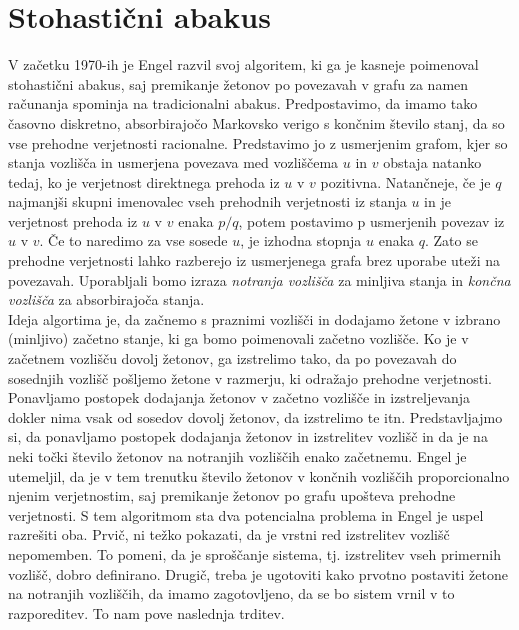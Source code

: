 \documentclass[twoside,11pt]{article}
\begin{document}
\section{Stohastični abakus}
V začetku 1970-ih je Engel razvil svoj algoritem, ki ga je kasneje poimenoval stohastični abakus, saj premikanje žetonov po povezavah v grafu za namen računanja spominja na tradicionalni abakus.
\indent Predpostavimo, da imamo tako časovno diskretno, absorbirajočo Markovsko verigo s končnim število stanj, da so vse prehodne verjetnosti racionalne. Predstavimo jo z usmerjenim grafom, kjer so stanja vozlišča in usmerjena povezava med vozliščema $u$ in $v$ obstaja natanko tedaj, ko je verjetnost direktnega prehoda iz $u$ v $v$ pozitivna. 
Natančneje, če je $q$ najmanjši skupni imenovalec vseh prehodnih verjetnosti iz stanja $u$ in je verjetnost prehoda iz $u$ v $v$ enaka $p/q$, potem postavimo p usmerjenih povezav iz $u$ v $v$. Če to naredimo za vse sosede $u$, je izhodna stopnja $u$ enaka $q$. Zato se prehodne verjetnosti lahko razberejo iz usmerjenega grafa brez uporabe uteži na povezavah. 
Uporabljali bomo izraza \emph{notranja vozlišča} za minljiva stanja in \emph{končna vozlišča} za absorbirajoča stanja. \\
\indent Ideja algortima je, da začnemo s praznimi vozlišči in dodajamo žetone v izbrano (minljivo) začetno stanje, ki ga bomo poimenovali začetno vozlišče. Ko je v začetnem vozlišču dovolj žetonov, ga izstrelimo tako, da po povezavah do sosednjih vozlišč pošljemo žetone v razmerju, ki odražajo prehodne verjetnosti. Ponavljamo postopek dodajanja žetonov v začetno vozlišče in izstreljevanja dokler nima vsak od sosedov dovolj žetonov, da izstrelimo te itn. Predstavljajmo si, da ponavljamo postopek dodajanja žetonov in izstrelitev vozlišč in
da je na neki točki število žetonov na notranjih vozliščih enako začetnemu. Engel je utemeljil, da je v tem trenutku število žetonov v končnih vozliščih proporcionalno njenim verjetnostim, saj premikanje žetonov po grafu upošteva prehodne verjetnosti. %
\newline 
\indent S tem algoritmom sta dva potencialna problema in Engel je uspel razrešiti oba. Prvič, ni težko pokazati, da je vrstni red izstrelitev vozlišč nepomemben. To pomeni, da je sproščanje sistema, tj. izstrelitev vseh primernih vozlišč, dobro definirano. Drugič, treba je ugotoviti kako prvotno postaviti žetone na notranjih vozliščih, da imamo zagotovljeno, da se bo sistem vrnil v to razporeditev. To nam pove naslednja trditev.  
\end{document}
